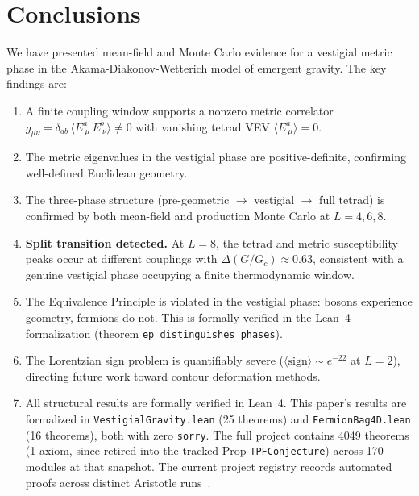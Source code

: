 \documentclass[aps,prd,twocolumn,superscriptaddress,nofootinbib]{revtex4-2}
\newcommand{\vev}[1]{\langle #1 \rangle}
\newcommand{\Gc}{G_c}
\begin{document}
\section{Conclusions}
\label{sec:conclusions}

We have presented mean-field and Monte Carlo evidence for a vestigial
metric phase in the Akama-Diakonov-Wetterich model of emergent gravity.
The key findings are:

\begin{enumerate}
\item A finite coupling window supports a nonzero metric correlator
  $g_{\mu\nu} = \delta_{ab}\,\vev{E^a_{\ \mu}\, E^b_{\ \nu}} \neq 0$
  with vanishing tetrad VEV $\vev{E^a_{\ \mu}} = 0$.

\item The metric eigenvalues in the vestigial phase are positive-definite,
  confirming well-defined Euclidean geometry.

\item The three-phase structure (pre-geometric $\to$ vestigial $\to$
  full tetrad) is confirmed by both mean-field and production Monte Carlo
  at $L = 4, 6, 8$.

\item \textbf{Split transition detected.} At $L = 8$, the tetrad and
  metric susceptibility peaks occur at different couplings with
  $\Delta(G/\Gc) \approx 0.63$, consistent with a genuine vestigial
  phase occupying a finite thermodynamic window.

\item The Equivalence Principle is violated in the vestigial phase:
  bosons experience geometry, fermions do not. This is formally verified
  in the Lean~4 formalization (theorem \texttt{ep\_distinguishes\_phases}).

\item The Lorentzian sign problem is quantifiably severe
  ($\langle\text{sign}\rangle \sim e^{-22}$ at $L=2$), directing
  future work toward contour deformation methods.

\item All structural results are formally verified in Lean~4.
  This paper's results are formalized in \texttt{VestigialGravity.lean}
  (25 theorems) and \texttt{FermionBag4D.lean} (16 theorems), both
  with zero \texttt{sorry}. The full project contains 4049 theorems
  (1 axiom, since retired into the tracked Prop
  \texttt{TPFConjecture}) across 170 modules at that snapshot.
  The current project registry records \aristotleproved{} automated proofs
  across \aristotleruns{} distinct Aristotle runs~\cite{Aristotle}.
\end{enumerate}
\end{document}
